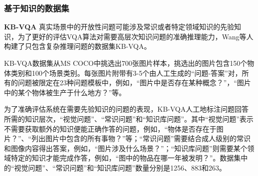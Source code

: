 \subsubsection{基于知识的数据集}
\textbf{KB-VQA}\qquad
真实场景中的开放性问题可能涉及常识或者特定领域知识的先验知识，为了更好的评估VQA算法对需要高层次知识问题的准确推理能力，Wang等人构建了只包含复杂推理问题的数据集KB-VQA。

KB-VQA数据集从MS COCO中挑选出700张图片样本，挑选出的图片包含150个物体类别和100个场景类别。每张图片附带有3-5个由人工生成的“问题-答案”对，所有的问题被限定在23种问题模板中，例如，“图片中是否存在某种概念？”，“图片中的某个物体被生产于什么地方？”等。

为了准确评估系统在需要先验知识的问题的表现，KB-VQA人工地标注问题回答所需的知识层次，“视觉问题”、“常识问题”和“知识库问题”。其中“视觉问题”表示不需要获取额外的知识便能正确作答的问题，例如，“物体是否存在于图片？”、“列出图片中包含的所有事物？”等；“常识问题”需要结合成人级别的常识和图像内容得出答案，例如，“图片涉及什么场景？”；“知识库问题”则需要某个领域特定的知识才能完成作答，例如，“图中的物品在哪一年被发明？”。数据集中的“视觉问题”、“常识问题”和“知识库问题”数量分别是1256、883和263。



